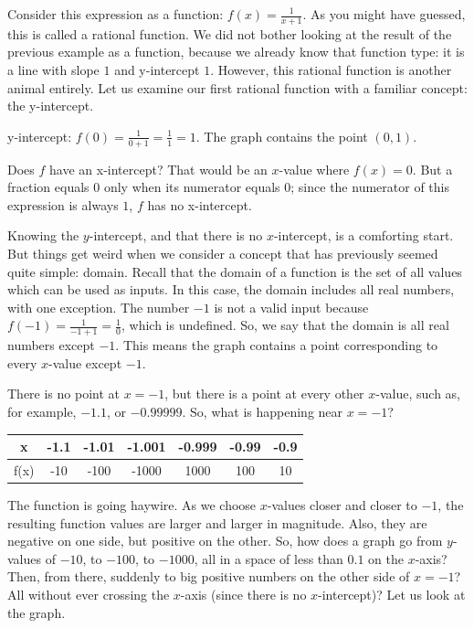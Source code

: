 Consider this expression as a function: \( f(x) = \frac{1}{x+1} \). As you might have guessed, this is called a rational function. We did not bother looking at the result of the previous example as a function, because we already know that function type: it is a line with slope \( 1 \) and y-intercept \( 1 \). However, this rational function is another animal entirely. Let us examine our first rational function with a familiar concept: the y-intercept. 

y-intercept: \( f(0) =\frac{1}{0 + 1} = \frac{1}{1} = 1 \). The graph contains the point \( (0, 1) \).

Does \( f \) have an x-intercept? That would be an \( x \)-value where \( f(x) = 0 \). But a fraction equals \( 0 \) only when its numerator equals \( 0 \); since the numerator of this expression is always \( 1 \), \( f \) has no x-intercept. 

Knowing the \( y \)-intercept, and that there is no \( x \)-intercept, is a comforting start. But things get weird when we consider a concept that has previously seemed quite simple: domain. Recall that the domain of a function is the set of all values which can be used as inputs. In this case, the domain includes all real numbers, with one exception. The number \( -1 \) is not a valid input because \( f(-1) = \frac{1}{-1+1} = \frac{1}{0} \), which is undefined. So, we say that the domain is all real numbers except \( -1 \). This means the graph contains a point corresponding to every \( x \)-value except \( -1 \).

There is no point at \( x = -1 \), but there is a point at every other \( x \)-value, such as, for example, \( -1.1 \), or \( -0.99999 \). So, what is happening near \( x = -1 \)?

\begin{center}
\begin{tabular}{ |c|c|c|c|c|c|c| } 
 \hline
 x & -1.1 & -1.01 & -1.001 & -0.999 & -0.99 & -0.9 \\ 
 \hline
 f(x) & -10 & -100 & -1000 & 1000 & 100 & 10 \\ 
 \hline
\end{tabular}
\end{center}

The function is going haywire. As we choose \( x \)-values closer and closer to \( -1 \), the resulting function values are larger and larger in magnitude. Also, they are negative on one side, but positive on the other. So, how does a graph go from \( y \)-values of \( -10 \), to \( -100 \), to \( -1000 \), all in a space of less than \( 0.1 \) on the \( x \)-axis? Then, from there, suddenly to big positive numbers on the other side of \( x = -1 \)? All without ever crossing the \( x \)-axis (since there is no \( x \)-intercept)? Let us look at the graph.

